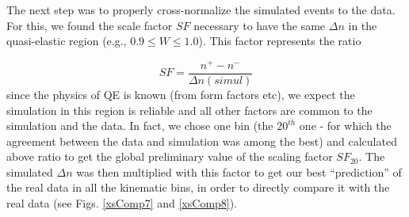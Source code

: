 The next step was to properly cross-normalize the simulated events to the data.%
For this, we %
found the scale factor $SF$ necessary to have the same $\Delta n$ in the quasi-elastic region (e.g., $0.9 \le W \le 1.0$). This factor represents the ratio

\begin{equation}
 SF = \frac{n^+ - n^-}{\Delta n(simul)} %
\end{equation}
since the physics of QE is known (from form factors etc), we expect the simulation in this region is reliable %
 and all other factors are common to the simulation and the data.
 In fact, we chose one \qsqs bin (the $20^{th}$ one - for which the agreement between the data and simulation was among the best) and calculated above ratio to get the global preliminary value of the scaling factor $SF_{20}$. The simulated $\Delta n$ was then multiplied with this factor to get our best ``prediction'' of the real data in all the kinematic bins, in order to directly compare it with the real data (see Figs. \ref{xsComp7} and \ref{xsComp8}). 




